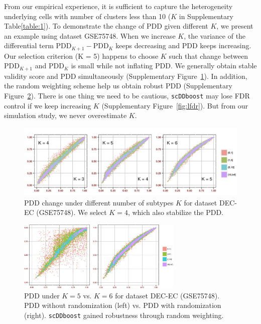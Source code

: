 \documentclass[aoas,preprint]{imsart}
\begin{document}
From our empirical experience, 
it is sufficient to capture the heterogeneity underlying cells with number of clusters less than 10 ($K$ in Supplementary Table\ref{table:1}).  
To demonstrate the change of PDD given different $K$, we present an example using dataset GSE75748. When we increase $K$, the variance of the differential term $\text{PDD}_{K + 1} - \text{PDD}_K$ keeps decreasing and PDD keeps increasing. Our selection criterion (K = 5) happens to choose $K$ such that change between $\text{PDD}_{K + 1}$ and $\text{PDD}_K$ is small while not inflating PDD. We generally obtain stable validity score and PDD simultaneously (Supplementary Figure~\ref{fig:rwk}). In addition, the random weighting scheme help us obtain robust PDD (Supplementary Figure~\ref{fig:s10}). 
There is one thing we need to be cautious, \texttt{scDDboost} may lose FDR control if we keep increasing $K$ (Supplementary Figure~\ref{fig:lfdr}).
But from our simulation study, we never overestimate $K$. 

\begin{figure}[h]
\includegraphics[width = 1\textwidth]{Figs/Kchange.png}
\caption{PDD change under different number of subtypes $K$ for dataset DEC-EC (GSE75748). We select $K = 4$, which also stabilize the PDD.}
\label{fig:rwk}
\end{figure}


\begin{figure}[h]
\includegraphics[width = 0.7\textwidth]{Figs/rw.pdf}
\caption{PDD under $K = 5$ vs. $K = 6$ for dataset DEC-EC (GSE75748). PDD without randomization (left) vs. PDD with randomization (right). \texttt{scDDboost} gained robustness through random weighting.}
\label{fig:s10}
\end{figure}
\end{document}
